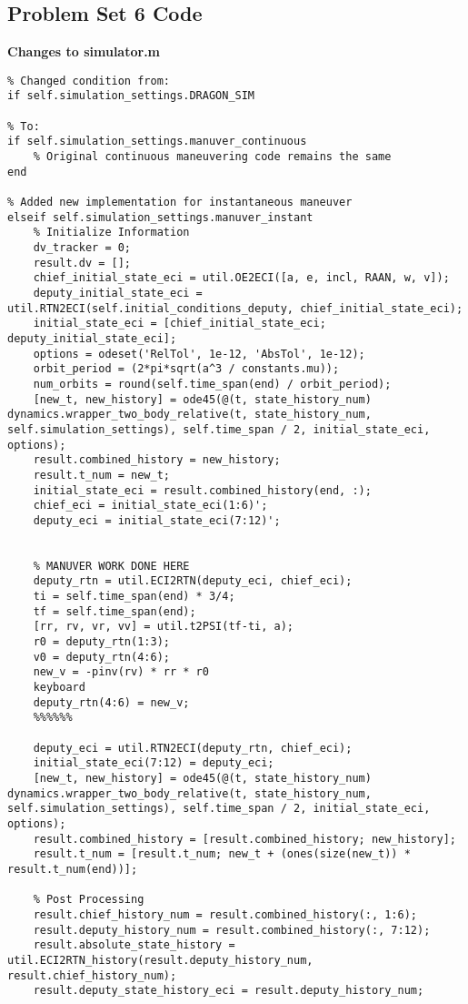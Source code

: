 \subsection{Problem Set 6 Code}

\textbf{Changes to simulator.m}
\begin{lstlisting}
% Changed condition from:
if self.simulation_settings.DRAGON_SIM

% To:
if self.simulation_settings.manuver_continuous
    % Original continuous maneuvering code remains the same
end

% Added new implementation for instantaneous maneuver
elseif self.simulation_settings.manuver_instant
    % Initialize Information
    dv_tracker = 0;
    result.dv = [];
    chief_initial_state_eci = util.OE2ECI([a, e, incl, RAAN, w, v]);
    deputy_initial_state_eci = util.RTN2ECI(self.initial_conditions_deputy, chief_initial_state_eci);
    initial_state_eci = [chief_initial_state_eci; deputy_initial_state_eci];
    options = odeset('RelTol', 1e-12, 'AbsTol', 1e-12);
    orbit_period = (2*pi*sqrt(a^3 / constants.mu));
    num_orbits = round(self.time_span(end) / orbit_period);
    [new_t, new_history] = ode45(@(t, state_history_num) dynamics.wrapper_two_body_relative(t, state_history_num, self.simulation_settings), self.time_span / 2, initial_state_eci, options);
    result.combined_history = new_history;
    result.t_num = new_t;
    initial_state_eci = result.combined_history(end, :);
    chief_eci = initial_state_eci(1:6)';
    deputy_eci = initial_state_eci(7:12)';
    
        
    % MANUVER WORK DONE HERE
    deputy_rtn = util.ECI2RTN(deputy_eci, chief_eci);
    ti = self.time_span(end) * 3/4;
    tf = self.time_span(end);
    [rr, rv, vr, vv] = util.t2PSI(tf-ti, a);
    r0 = deputy_rtn(1:3);
    v0 = deputy_rtn(4:6);
    new_v = -pinv(rv) * rr * r0
    keyboard
    deputy_rtn(4:6) = new_v;
    %%%%%%

    deputy_eci = util.RTN2ECI(deputy_rtn, chief_eci);
    initial_state_eci(7:12) = deputy_eci;
    [new_t, new_history] = ode45(@(t, state_history_num) dynamics.wrapper_two_body_relative(t, state_history_num, self.simulation_settings), self.time_span / 2, initial_state_eci, options);
    result.combined_history = [result.combined_history; new_history];
    result.t_num = [result.t_num; new_t + (ones(size(new_t)) * result.t_num(end))];
    
    % Post Processing
    result.chief_history_num = result.combined_history(:, 1:6);
    result.deputy_history_num = result.combined_history(:, 7:12);
    result.absolute_state_history = util.ECI2RTN_history(result.deputy_history_num, result.chief_history_num);
    result.deputy_state_history_eci = result.deputy_history_num;
\end{lstlisting}

